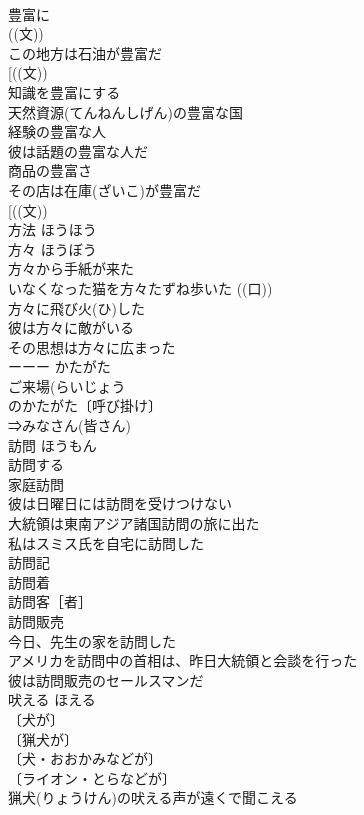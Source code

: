 \documentclass[8pt]{extreport}
\begin{document}
\begin{CJK}{UTF8}{min}
\\	豊富に 
\\	((文)) 
\\	この地方は石油が豊富だ 
\\	[((文))
\\	知識を豊富にする 
\\	天然資源(てんねんしげん)の豊富な国 
\\	経験の豊富な人 
\\	彼は話題の豊富な人だ 
\\	商品の豊富さ 
\\	その店は在庫(ざいこ)が豊富だ 
\\	[((文)) 
\\	方法	ほうほう	
\\	方々	ほうぼう	
\\	方々から手紙が来た 
\\	いなくなった猫を方々たずね歩いた ((口)) 
\\	方々に飛び火(ひ)した 
\\	彼は方々に敵がいる 
\\	その思想は方々に広まった 
\\	ーーー かたがた 
\\	ご来場(らいじょう　
\\	のかたがた〔呼び掛け〕 
\\	⇒みなさん(皆さん)
\\	訪問	ほうもん	
\\	訪問する 
\\	家庭訪問 
\\	彼は日曜日には訪問を受けつけない 
\\	大統領は東南アジア諸国訪問の旅に出た 
\\	私はスミス氏を自宅に訪問した 
\\	訪問記 
\\	訪問着 
\\	訪問客［者］ 
\\	訪問販売 
\\	今日、先生の家を訪問した 
\\	アメリカを訪問中の首相は、昨日大統領と会談を行った 
\\	彼は訪問販売のセールスマンだ 
\\	吠える	ほえる	
\\	〔犬が〕
\\	〔猟犬が〕
\\	〔犬・おおかみなどが〕
\\	〔ライオン・とらなどが〕
\\	猟犬(りょうけん)の吠える声が遠くで聞こえる 

\end{CJK}
\end{document}
